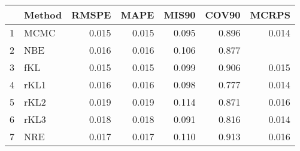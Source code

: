 \documentclass[12pt]{article}
\begin{document}
\thispagestyle{empty}
\begin{table}[ht]
\centering
\begin{tabular}{rlrrrrr}
  \hline
 & Method & RMSPE & MAPE & MIS90 & COV90 & MCRPS \\ 
  \hline
1 & MCMC & 0.015 & 0.015 & 0.095 & 0.896 & 0.014 \\ 
  2 & NBE & 0.016 & 0.016 & 0.106 & 0.877 &  \\ 
  3 & fKL & 0.015 & 0.015 & 0.099 & 0.906 & 0.015 \\ 
  4 & rKL1 & 0.016 & 0.016 & 0.098 & 0.777 & 0.014 \\ 
  5 & rKL2 & 0.019 & 0.019 & 0.114 & 0.871 & 0.016 \\ 
  6 & rKL3 & 0.018 & 0.018 & 0.091 & 0.816 & 0.014 \\ 
  7 & NRE & 0.017 & 0.017 & 0.110 & 0.913 & 0.016 \\ 
   \hline
\end{tabular}
\end{table}
\end{document}
